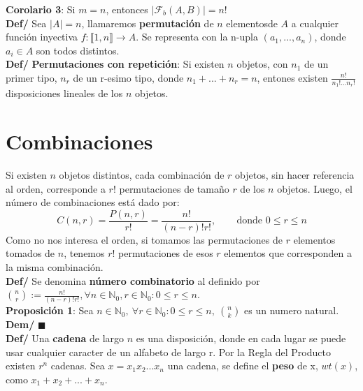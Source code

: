 \documentclass[11pt,a4paper]{article}
\newcommand*{\QEDA}{\null\nobreak\hfill\ensuremath{\blacksquare}}
\begin{document}
\noindent \textbf{Corolario 3}: Si $m=n$, entonces $|\mathcal{F}_b(A,B)| = n!$ \\

\noindent \textbf{Def/} Sea $|A| = n$, llamaremos \textbf{permutaci\'on} de $n$ elementosde $A$ a cualquier funci\'on inyectiva $f : \llbracket 1,n \rrbracket \rightarrow A$. Se representa con la n-upla $(a_1,...,a_n)$, donde $a_i \in A$ son todos distintos.\\

\noindent \textbf{Def/} \textbf{Permutaciones con repetici\'on}: Si existen $n$ objetos, con $n_1$ de un primer tipo, $n_r$ de un r-esimo tipo, donde $n_1+...+n_r = n$, entones existen $\frac{n!}{n_1!...n_r!}$ disposiciones lineales de los $n$ objetos.

\section{Combinaciones}
\noindent Si existen $n$ objetos distintos, cada combinación de $r$ objetos, sin hacer referencia al orden, corresponde a $r!$ permutaciones de tamaño $r$ de los $n$ objetos. Luego, el número de combinaciones está dado por:
$$C(n,r) = \dfrac{P(n,r)}{r!} = \dfrac{n!}{(n-r)!r!}, \ \ \ \ \ \ \ \ \text{ donde } 0 \leq r \leq n$$
Como no nos interesa el orden, si tomamos las permutaciones de $r$ elementos tomados de $n$, tenemos $r!$ permutaciones de esos $r$ elementos que corresponden a la misma combinaci\'on.\\

\noindent \textbf{Def/} Se denomina \textbf{n\'umero combinatorio} al definido por ${n \choose r} := \frac{n!}{(n-r)!r!}, \forall n \in \mathbb{N}_0, r \in \mathbb{N}_0 : 0 \leq r \leq n$.\\

\noindent \textbf{Proposici\'on 1}: Sea $n \in \mathbb{N}_0,\ \forall r \in \mathbb{N}_0 : 0 \leq r \leq n,\ {n \choose k}$ es un numero natural. \\
\textbf{Dem/} \QEDA\\


\noindent \textbf{Def/} Una \textbf{cadena} de largo $n$ es una disposici\'on, donde en cada lugar se puede usar cualquier caracter de un alfabeto de largo r. Por la Regla del Producto existen $r^n$ cadenas. Sea $x=x_1x_2...x_n$ una cadena, se define el \textbf{peso} de x, $wt(x)$, como $x_1+x_2+...+x_n$.\\

\newpage
\end{document}
